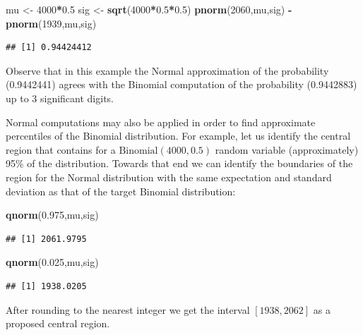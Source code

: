 \documentclass[]{krantz}
\makeatletter
\newenvironment{Shaded}{\begin{snugshade}}{\end{snugshade}}
\newcommand{\DecValTok}[1]{\textcolor[rgb]{0.00,0.00,0.81}{#1}}
\newcommand{\FloatTok}[1]{\textcolor[rgb]{0.00,0.00,0.81}{#1}}
\newcommand{\KeywordTok}[1]{\textcolor[rgb]{0.13,0.29,0.53}{\textbf{#1}}}
\newcommand{\NormalTok}[1]{#1}
\newcommand{\OperatorTok}[1]{\textcolor[rgb]{0.81,0.36,0.00}{\textbf{#1}}}
\newcommand{\StringTok}[1]{\textcolor[rgb]{0.31,0.60,0.02}{#1}}
\newenvironment{kframe}{%
\medskip{}
\setlength{\fboxsep}{.8em}
 \def\at@end@of@kframe{}%
 \ifinner\ifhmode%
  \def\at@end@of@kframe{\end{minipage}}%
  \begin{minipage}{\columnwidth}%
 \fi\fi%
 \def\FrameCommand##1{\hskip\@totalleftmargin \hskip-\fboxsep
 \colorbox{shadecolor}{##1}\hskip-\fboxsep
     \hskip-\linewidth \hskip-\@totalleftmargin \hskip\columnwidth}%
 \MakeFramed {\advance\hsize-\width
   \@totalleftmargin\z@ \linewidth\hsize
   \@setminipage}}%
 {\par\unskip\endMakeFramed%
 \at@end@of@kframe}
\renewenvironment{Shaded}{\begin{kframe}}{\end{kframe}}
\theoremstyle{definition}
\theoremstyle{definition}
\theoremstyle{definition}
\theoremstyle{remark}
\makeatother
\begin{document}
\begin{Shaded}
\begin{Highlighting}[]
\NormalTok{mu <-}\StringTok{ }\DecValTok{4000}\OperatorTok{*}\FloatTok{0.5}
\NormalTok{sig <-}\StringTok{ }\KeywordTok{sqrt}\NormalTok{(}\DecValTok{4000}\OperatorTok{*}\FloatTok{0.5}\OperatorTok{*}\FloatTok{0.5}\NormalTok{)}
\KeywordTok{pnorm}\NormalTok{(}\DecValTok{2060}\NormalTok{,mu,sig) }\OperatorTok{-}\StringTok{ }\KeywordTok{pnorm}\NormalTok{(}\DecValTok{1939}\NormalTok{,mu,sig)}
\end{Highlighting}
\end{Shaded}

\begin{verbatim}
## [1] 0.94424412
\end{verbatim}

Observe that in this example the Normal approximation of the probability
(0.9442441) agrees with the Binomial computation of the probability
(0.9442883) up to 3 significant digits.

Normal computations may also be applied in order to find approximate
percentiles of the Binomial distribution. For example, let us identify
the central region that contains for a \(\mathrm{Binomial}(4000,0.5)\)
random variable (approximately) 95\% of the distribution. Towards that
end we can identify the boundaries of the region for the Normal
distribution with the same expectation and standard deviation as that of
the target Binomial distribution:

\begin{Shaded}
\begin{Highlighting}[]
\KeywordTok{qnorm}\NormalTok{(}\FloatTok{0.975}\NormalTok{,mu,sig)}
\end{Highlighting}
\end{Shaded}

\begin{verbatim}
## [1] 2061.9795
\end{verbatim}

\begin{Shaded}
\begin{Highlighting}[]
\KeywordTok{qnorm}\NormalTok{(}\FloatTok{0.025}\NormalTok{,mu,sig)}
\end{Highlighting}
\end{Shaded}

\begin{verbatim}
## [1] 1938.0205
\end{verbatim}

After rounding to the nearest integer we get the interval \([1938,2062]\)
as a proposed central region.
\end{document}
